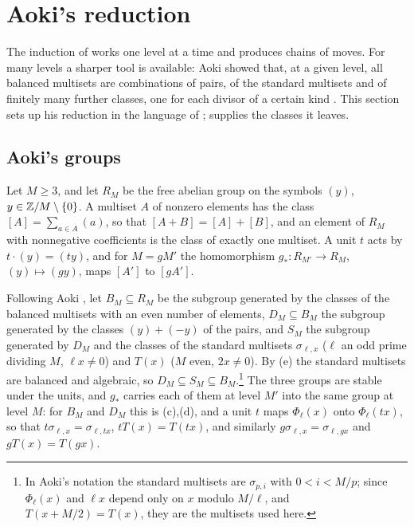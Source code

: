 \section{Aoki's reduction}\label{sec:aoki}

The induction of  works one level at a time and
produces chains of moves. For many levels a sharper tool is available: Aoki
showed that, at a given level, all balanced multisets are combinations of
pairs, of the standard multisets and of finitely many further classes, one
for each divisor of a certain kind \cite{Aok83,Aok00}. This section sets up
his reduction in the language of ; 
supplies the classes it leaves.

\subsection{Aoki's groups}
Let $M\ge3$, and let $R_{M}$ be the free abelian group on the symbols $(y)$,
$y\in\mathbb{Z}/M\setminus\{0\}$. A multiset $A$ of nonzero elements has the class
$[A]=\sum_{a\in A}(a)$, so that $[A+B]=[A]+[B]$, and an element of $R_{M}$
with nonnegative coefficients is the class of exactly one multiset. A unit
$t$ acts by $t\cdot(y)=(ty)$, and for $M=gM'$ the homomorphism
$g_{*}\colon R_{M'}\to R_{M}$, $(y)\mapsto(gy)$, maps $[A']$ to $[gA']$.

Following Aoki \cite[\S2]{Aok00}, let $B_{M}\subseteq R_{M}$ be the subgroup
generated by the classes of the balanced multisets with an even number of
elements, $D_{M}\subseteq B_{M}$ the subgroup generated by the classes
$(y)+(-y)$ of the pairs, and $S_{M}$ the subgroup generated by $D_{M}$ and
the classes of the standard multisets $\sigma_{\ell,x}$ ($\ell$ an odd prime
dividing $M$, $\ell x\ne0$) and $T(x)$ ($M$ even, $2x\ne0$). By
(e) the standard multisets are balanced and algebraic,
so $D_{M}\subseteq S_{M}\subseteq B_{M}$.\footnote{In Aoki's notation the
standard multisets are $\sigma_{p,i}$ with $0<i<M/p$; since $\Phi_{\ell}(x)$
and $\ell x$ depend only on $x$ modulo $M/\ell$, and $T(x+M/2)=T(x)$, they
are the multisets used here.} The three groups are stable under the units,
and $g_{*}$ carries each of them at level $M'$ into the same group at level
$M$: for $B_{M}$ and $D_{M}$ this is (c),(d), and a unit
$t$ maps $\Phi_{\ell}(x)$ onto $\Phi_{\ell}(tx)$, so that
$t\sigma_{\ell,x}=\sigma_{\ell,tx}$, $tT(x)=T(tx)$, and similarly
$g\sigma_{\ell,x}=\sigma_{\ell,gx}$ and $gT(x)=T(gx)$.

